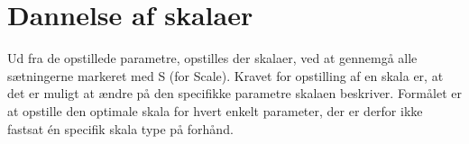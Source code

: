 \section{Dannelse af skalaer}
\label{ParametreDatabehandlingSkalaer}
%
Ud fra de opstillede parametre, opstilles der skalaer, ved at gennemgå alle sætningerne markeret med S (for Scale). Kravet for opstilling af en skala er, at det er muligt at ændre på den specifikke parametre skalaen beskriver. Formålet er at opstille den optimale skala for hvert enkelt parameter, der er derfor ikke fastsat én specifik skala type på forhånd. 









